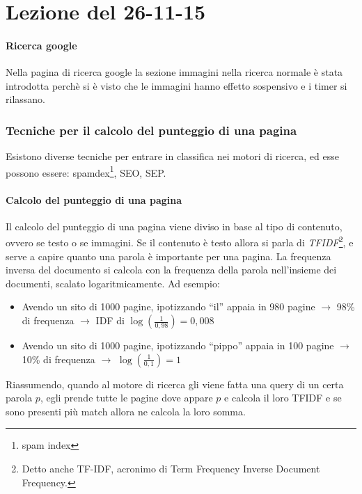 \section{Lezione del 26-11-15}

\paragraph*{Ricerca google}Nella pagina di ricerca google la sezione immagini nella ricerca normale \`e stata introdotta perch\`e si \`e visto che le immagini hanno effetto sospensivo e i timer si rilassano.

\subsubsection{Tecniche per il calcolo del punteggio di una pagina}
Esistono diverse tecniche per entrare in classifica nei motori di ricerca, ed esse possono essere: spamdex\footnote{spam index}, SEO, SEP.

\paragraph*{Calcolo del punteggio di una pagina}Il calcolo del punteggio di una pagina viene diviso in base al tipo di contenuto, ovvero se testo o se immagini. Se il contenuto \`e testo allora si parla di \textit{TFIDF}\footnote{Detto anche TF-IDF, acronimo di Term Frequency Inverse Document Frequency.}, e serve a capire quanto una parola \`e importante per una pagina. La frequenza inversa del documento si calcola con la frequenza della parola nell'insieme dei documenti, scalato logaritmicamente.
Ad esempio:
\begin{itemize}

\item Avendo un sito di 1000 pagine, ipotizzando ``il'' appaia in 980 pagine $\to$ 98\% di frequenza $\to$ IDF di $\log(\frac{1}{0,98}) = 0,008$
\item Avendo un sito di 1000 pagine, ipotizzando ``pippo'' appaia in 100 pagine $\to$ 10\% di frequenza $\to$ $\log( \frac{1}{0,1}) = 1 $
\end{itemize}

Riassumendo, quando al motore di ricerca gli viene fatta una query di un certa parola $p$, egli prende tutte le pagine dove appare $p$ e calcola il loro TFIDF e se sono presenti pi\`u match allora ne calcola la loro somma.

